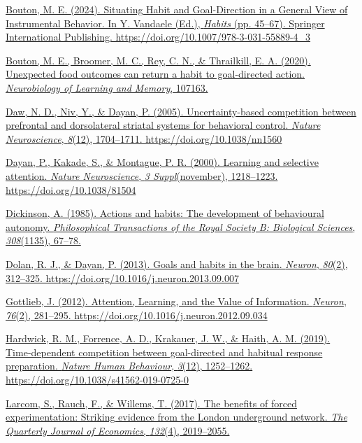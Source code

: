 \href{https://www.zotero.org/google-docs/?BlKSSL}{Bouton, M. E. (2024). Situating Habit and Goal-Direction in a General View of Instrumental Behavior. In Y. Vandaele (Ed.), \emph{Habits} (pp. 45--67). Springer International Publishing. https://doi.org/10.1007/978-3-031-55889-4\_3}

\href{https://www.zotero.org/google-docs/?BlKSSL}{Bouton, M. E., Broomer, M. C., Rey, C. N., \& Thrailkill, E. A. (2020). Unexpected food outcomes can return a habit to goal-directed action. \emph{Neurobiology of Learning and Memory}, 107163.}

\href{https://www.zotero.org/google-docs/?BlKSSL}{Daw, N. D., Niv, Y., \& Dayan, P. (2005). Uncertainty-based competition between prefrontal and dorsolateral striatal systems for behavioral control. \emph{Nature Neuroscience}, \emph{8}(12), 1704--1711. https://doi.org/10.1038/nn1560}

\href{https://www.zotero.org/google-docs/?BlKSSL}{Dayan, P., Kakade, S., \& Montague, P. R. (2000). Learning and selective attention. \emph{Nature Neuroscience}, \emph{3 Suppl}(november), 1218--1223. https://doi.org/10.1038/81504}

\href{https://www.zotero.org/google-docs/?BlKSSL}{Dickinson, A. (1985). Actions and habits: The development of behavioural autonomy. \emph{Philosophical Transactions of the Royal Society B: Biological Sciences}, \emph{308}(1135), 67--78.}

\href{https://www.zotero.org/google-docs/?BlKSSL}{Dolan, R. J., \& Dayan, P. (2013). Goals and habits in the brain. \emph{Neuron}, \emph{80}(2), 312--325. https://doi.org/10.1016/j.neuron.2013.09.007}

\href{https://www.zotero.org/google-docs/?BlKSSL}{Gottlieb, J. (2012). Attention, Learning, and the Value of Information. \emph{Neuron}, \emph{76}(2), 281--295. https://doi.org/10.1016/j.neuron.2012.09.034}

\href{https://www.zotero.org/google-docs/?BlKSSL}{Hardwick, R. M., Forrence, A. D., Krakauer, J. W., \& Haith, A. M. (2019). Time-dependent competition between goal-directed and habitual response preparation. \emph{Nature Human Behaviour}, \emph{3}(12), 1252--1262. https://doi.org/10.1038/s41562-019-0725-0}

\href{https://www.zotero.org/google-docs/?BlKSSL}{Larcom, S., Rauch, F., \& Willems, T. (2017). The benefits of forced experimentation: Striking evidence from the London underground network. \emph{The Quarterly Journal of Economics}, \emph{132}(4), 2019--2055.}

